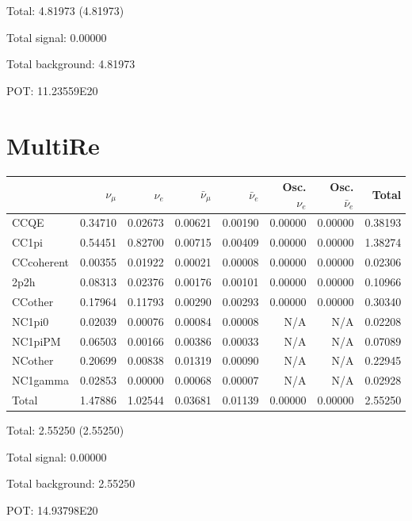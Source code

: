 \documentclass[10pt,a4paper]{article}
\begin{document}
Total: 4.81973    (4.81973)


Total signal: 0.00000


Total background: 4.81973

POT: 11.23559E20



\clearpage


\section*{MultiRe}
\begin{tabular} { | l ||r | r | r | r | r | r | | r | }
\hline
              & $\nu_\mu$            & $\nu_e$              & $\bar{\nu}_{\mu}$    & $\bar{\nu}_{e}$      & Osc. $\nu_e$         & Osc. $\bar{\nu}_{e}$ & Total                \\ \hline\hline
 CCQE         & 0.34710              & 0.02673              & 0.00621              & 0.00190              & 0.00000              & 0.00000              & 0.38193              \\ \hline
 CC1pi        & 0.54451              & 0.82700              & 0.00715              & 0.00409              & 0.00000              & 0.00000              & 1.38274              \\ \hline
 CCcoherent   & 0.00355              & 0.01922              & 0.00021              & 0.00008              & 0.00000              & 0.00000              & 0.02306              \\ \hline
 2p2h         & 0.08313              & 0.02376              & 0.00176              & 0.00101              & 0.00000              & 0.00000              & 0.10966              \\ \hline
 CCother      & 0.17964              & 0.11793              & 0.00290              & 0.00293              & 0.00000              & 0.00000              & 0.30340              \\ \hline
 NC1pi0       & 0.02039              & 0.00076              & 0.00084              & 0.00008              & N/A                  & N/A                  & 0.02208              \\ \hline
 NC1piPM      & 0.06503              & 0.00166              & 0.00386              & 0.00033              & N/A                  & N/A                  & 0.07089              \\ \hline
 NCother      & 0.20699              & 0.00838              & 0.01319              & 0.00090              & N/A                  & N/A                  & 0.22945              \\ \hline
 NC1gamma     & 0.02853              & 0.00000              & 0.00068              & 0.00007              & N/A                  & N/A                  & 0.02928              \\ \hline
\hline
 Total        & 1.47886              & 1.02544              & 0.03681              & 0.01139              & 0.00000              & 0.00000              & 2.55250              \\ \hline

\end{tabular}

Total: 2.55250    (2.55250)


Total signal: 0.00000


Total background: 2.55250

POT: 14.93798E20
\end{document}
